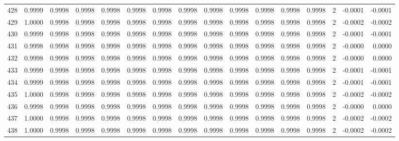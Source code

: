 \begin{tabular}{lrrrrrrrrrrrrrrr}
428 &      0.9999 &  0.9998 &  0.9998 &  0.9998 &  0.9998 &  0.9998 &  0.9998 &  0.9998 &  0.9998 &  0.9998 &   0.9998 &     0.9998 &      2 &                   -0.0001 &                    -0.0001 \\
429 &      1.0000 &  0.9998 &  0.9998 &  0.9998 &  0.9998 &  0.9998 &  0.9998 &  0.9998 &  0.9998 &  0.9998 &   0.9998 &     0.9998 &      2 &                   -0.0002 &                    -0.0002 \\
430 &      0.9999 &  0.9998 &  0.9998 &  0.9998 &  0.9998 &  0.9998 &  0.9998 &  0.9998 &  0.9998 &  0.9998 &   0.9998 &     0.9998 &      2 &                   -0.0001 &                    -0.0001 \\
431 &      0.9998 &  0.9998 &  0.9998 &  0.9998 &  0.9998 &  0.9998 &  0.9998 &  0.9998 &  0.9998 &  0.9998 &   0.9998 &     0.9998 &      2 &                   -0.0000 &                     0.0000 \\
432 &      0.9998 &  0.9998 &  0.9998 &  0.9998 &  0.9998 &  0.9998 &  0.9998 &  0.9998 &  0.9998 &  0.9998 &   0.9998 &     0.9998 &      2 &                   -0.0000 &                     0.0000 \\
433 &      0.9999 &  0.9998 &  0.9998 &  0.9998 &  0.9998 &  0.9998 &  0.9998 &  0.9998 &  0.9998 &  0.9998 &   0.9998 &     0.9998 &      2 &                   -0.0001 &                    -0.0001 \\
434 &      0.9999 &  0.9998 &  0.9998 &  0.9998 &  0.9998 &  0.9998 &  0.9998 &  0.9998 &  0.9998 &  0.9998 &   0.9998 &     0.9998 &      2 &                   -0.0001 &                    -0.0001 \\
435 &      1.0000 &  0.9998 &  0.9998 &  0.9998 &  0.9998 &  0.9998 &  0.9998 &  0.9998 &  0.9998 &  0.9998 &   0.9998 &     0.9998 &      2 &                   -0.0002 &                    -0.0002 \\
436 &      0.9998 &  0.9998 &  0.9998 &  0.9998 &  0.9998 &  0.9998 &  0.9998 &  0.9998 &  0.9998 &  0.9998 &   0.9998 &     0.9998 &      2 &                   -0.0000 &                     0.0000 \\
437 &      1.0000 &  0.9998 &  0.9998 &  0.9998 &  0.9998 &  0.9998 &  0.9998 &  0.9998 &  0.9998 &  0.9998 &   0.9998 &     0.9998 &      2 &                   -0.0002 &                    -0.0002 \\
438 &      1.0000 &  0.9998 &  0.9998 &  0.9998 &  0.9998 &  0.9998 &  0.9998 &  0.9998 &  0.9998 &  0.9998 &   0.9998 &     0.9998 &      2 &                   -0.0002 &                    -0.0002 \\

\end{tabular}
